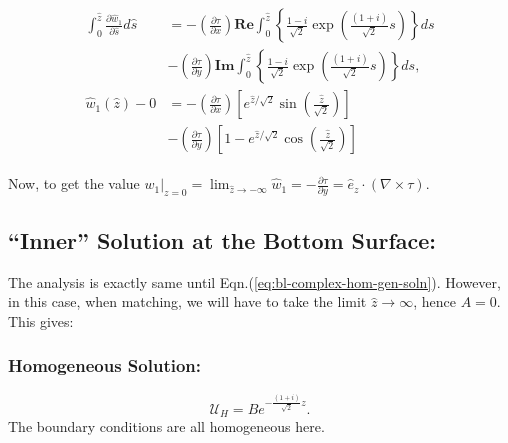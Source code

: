 \documentclass{article}
\newcommand{\pd}[2]{\frac{\partial{#1}}{\partial{#2}}}
\begin{document}
\begin{align}
 \begin{split}
  \int_{0}^{\hat{z} }\pd{\hat{w}_{1}}{\hat{s}} d\hat{s} &= - \left(\pd{\tau}{x}\right) \mathbf{Re}\int_{0}^{\hat{z}} \left\{\frac{1-i}{\sqrt{2}}\exp{\left(\frac{(1+i)}{\sqrt{2}}s\right)} \right\} ds \\
  &- \left(\pd{\tau}{y}\right)\mathbf{Im}\int_{0}^{\hat{z}} \left\{\frac{1-i}{\sqrt{2}}\exp{\left(\frac{(1+i)}{\sqrt{2}}s\right)} \right\} ds, \\
  \hat{w}_{1}(\hat{z}) - 0 &= - \left(\pd{\tau}{x}\right)\left[ e^{\hat{z}/\sqrt{2}} \sin{\left(\frac{\hat{z}}{\sqrt{2}}\right)}  \right]\\
  &-\left(\pd{\tau}{y}\right)\left[ 1 - e^{\hat{z}/\sqrt{2}} \cos{\left(\frac{\hat{z}}{\sqrt{2}}\right)}  \right]
 \end{split}
\end{align}

Now, to get the value $\boxed{w_{1}|_{z=0} =\lim_{\hat{z} \rightarrow -\infty}\hat{w}_{1} = - \pd{\tau}{y} = \hat{e}_{z}\cdot(\nabla \times \tau) }$.
\subsection{``Inner'' Solution at the Bottom Surface:}
The analysis is exactly same until Eqn.(\ref{eq:bl-complex-hom-gen-soln}). However, in this case, when matching, we will have to take the limit $\hat{z}\rightarrow \infty$, hence $\boxed{A = 0}$. This gives:
\subsubsection{Homogeneous Solution:}
\begin{equation}\label{eq:bl-complex-hom-bottom}
 \mathcal{U}_{H} = B e^{-\frac{(1+i)}{\sqrt{2}}z}.
\end{equation}
The boundary conditions are all homogeneous here. 


 \if@openright\cleardoublepage\else\clearpage\fi
 \cleardoublepage
 \pagestyle{empty}
\end{document}
